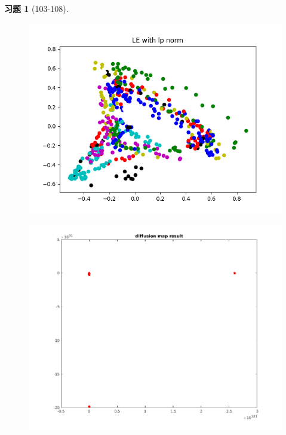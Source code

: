 \documentclass[a4paper, UTF8]{ctexart}
\newtheorem*{exercise}{\textbf{习题}}
\begin{document}
\begin{exercise}[103-108]
\begin{figure}[htbp!]
  		\includegraphics[width = \textwidth]{hw7_fig5.png}
  	\end{figure}
  	\clearpage
    \begin{figure}[htbp!]
      \centering
      \includegraphics[width = \textwidth]{hw7_fig6.png}
    \end{figure}
    \clearpage
    \begin{figure}[htbp!]
      \centering

\end{figure}
\end{exercise}
\end{document}
